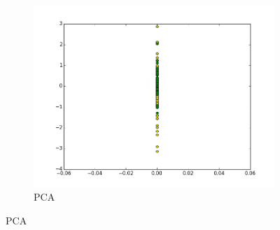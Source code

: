 \documentclass[a4paper,12pt]{article}    %
\begin{document}
\begin{figure}[!hb]
\begin{subfigure}{.45\textwidth}
		\includegraphics[width=\linewidth]{img/3pca.png}
		\caption{PCA}
	\end{subfigure}
	\label{dataset1}
\end{figure}
\vfill
\clearpage
\end{document}
